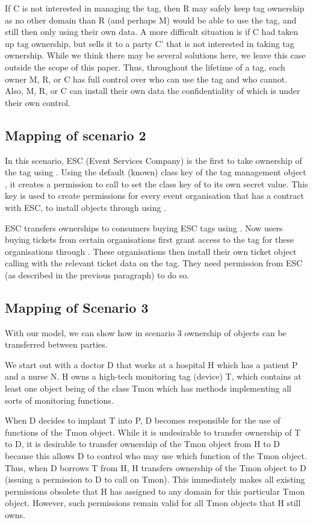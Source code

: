 If C is not interested in managing the tag, then R may safely keep tag ownership 
as no other domain than R (and perhaps M) would be able to use the tag, 
and still then only using their own data. 
A more difficult situation is if C had taken up tag ownership, but sells it to 
a party C' that is not interested in taking tag ownership. While we think there
may be several solutions here, we leave this case outside the scope of this paper.
Thus, throughout the lifetime of a tag, each owner M, R, or C has full control
over who can use the tag and who cannot. Also, M, R, or C can install their own
data the confidentiality of which is under their own control.

\subsection{Mapping of scenario 2}
In this scenario, ESC (Event Services Company) is the first to take ownership
of the tag using . Using the default (known) class key
of the tag management object , it creates a permission to call 
 to set the class key of  to its own 
secret value. This key is used to create permissions for every event 
organisation that has a contract with ESC, to install objects through
 using .

ESC transfers ownerships to consumers buying ESC tags using
. Now users buying tickets from certain organisations
first grant access to the tag for these organisations through
. These organisations then install their own ticket object
calling  with the relevant ticket data on the tag. They
need permission from ESC (as described in the previous paragraph) to do so.

\subsection{Mapping of Scenario 3}

With our model, we can show how in scenario 3 ownership of objects can be
transferred between parties. 

We start out with a doctor D that works at a hospital H which has a patient P
and a nurse N. H owns a high-tech monitoring tag (device) T, which contains at
least one object being of the class Tmon which has methods implementing all
sorts of monitoring functions. 

When D decides to implant T into P, D becomes responsible for the use of
functions of the Tmon object. While it is undesirable to transfer ownership of
T to D, it is desirable to transfer ownership of the Tmon object from H to D
because this allows D to control who may use which function of the Tmon
object. Thus, when D borrows T from H, H transfers ownership of the Tmon object
to D (issuing a permission to D to call  on Tmon). 
This immediately makes all
existing permissions obsolete that H has assigned to any domain for this
particular Tmon object. However, such permissions remain valid for all Tmon
objects that H still owns. 

